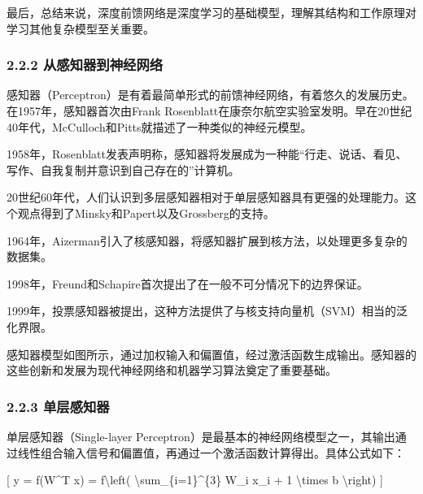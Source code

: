 最后，总结来说，深度前馈网络是深度学习的基础模型，理解其结构和工作原理对学习其他复杂模型至关重要。

\subsubsection{\texorpdfstring{\textbf{2.2.2
从感知器到神经网络}}{2.2.2 从感知器到神经网络}}\label{222-ux4eceux611fux77e5ux5668ux5230ux795eux7ecfux7f51ux7edc}

感知器（Perceptron）是有着最简单形式的前馈神经网络，有着悠久的发展历史。在1957年，感知器首次由Frank
Rosenblatt在康奈尔航空实验室发明。早在20世纪40年代，McCulloch和Pitts就描述了一种类似的神经元模型。

1958年，Rosenblatt发表声明称，感知器将发展成为一种能``行走、说话、看见、写作、自我复制并意识到自己存在的''计算机。

20世纪60年代，人们认识到多层感知器相对于单层感知器具有更强的处理能力。这个观点得到了Minsky和Papert以及Grossberg的支持。

1964年，Aizerman引入了核感知器，将感知器扩展到核方法，以处理更多复杂的数据集。

1998年，Freund和Schapire首次提出了在一般不可分情况下的边界保证。

1999年，投票感知器被提出，这种方法提供了与核支持向量机（SVM）相当的泛化界限。

感知器模型如图所示，通过加权输入和偏置值，经过激活函数生成输出。感知器的这些创新和发展为现代神经网络和机器学习算法奠定了重要基础。


\subsubsection{\texorpdfstring{\textbf{2.2.3
单层感知器}}{2.2.3 单层感知器}}\label{223-ux5355ux5c42ux611fux77e5ux5668}

单层感知器（Single-layer
Perceptron）是最基本的神经网络模型之一，其输出通过线性组合输入信号和偏置值，再通过一个激活函数计算得出。具体公式如下：

{[} y = f(W\^{}T x) = f\textbackslash left(
\textbackslash sum\_\{i=1\}\^{}\{3\} W\_i x\_i + 1 \textbackslash times
b \textbackslash right) {]}


